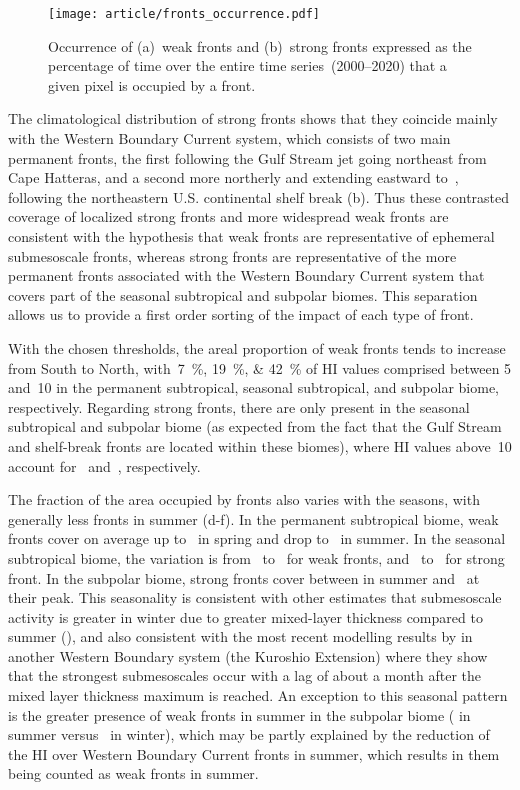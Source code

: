 \begin{figure}
  \centering
  \texttt{[image: article/fronts\_occurrence.pdf]}
  \caption[Occurrence map of strong and weak fronts]{%
    Occurrence of (a)~weak fronts and (b)~strong fronts expressed as the percentage of time over the entire time series~(2000--2020) that a given pixel is occupied by a front.
  }%
  \label{fig:frt-occurrence}
\end{figure}

The climatological distribution of strong fronts shows that they coincide mainly with the Western Boundary Current system, which consists of two main permanent fronts, the first following the Gulf Stream jet going northeast from Cape Hatteras, and a second more northerly and extending eastward to~, following the northeastern U.S. continental shelf break (b).
Thus these contrasted coverage of localized strong fronts and more widespread weak fronts are consistent with the hypothesis that weak fronts are representative of ephemeral submesoscale fronts, whereas strong fronts are representative of the more permanent fronts associated with the Western Boundary Current system that covers part of the seasonal subtropical and subpolar biomes.
This separation allows us to provide a first order sorting of the impact of each type of front.

With the chosen thresholds, the areal proportion of weak fronts tends to increase from South to North, with~\qtylist{7;19;42}{\percent} of HI values comprised between 5 and~10 in the permanent subtropical, seasonal subtropical, and subpolar biome, respectively.
Regarding strong fronts, there are only present in the seasonal subtropical and subpolar biome (as expected from the fact that the Gulf Stream and shelf-break fronts are located within these biomes), where HI values above~10 account for ~and~, respectively.

The fraction of the area occupied by fronts also varies with the seasons, with generally less fronts in summer (d-f).
In the permanent subtropical biome, weak fronts cover on average up to~ in spring and drop to~ in summer.
In the seasonal subtropical biome, the variation is from~ to~ for weak fronts, and ~to~ for strong front.
In the subpolar biome, strong fronts cover between  in summer and~ at their peak.
This seasonality is consistent with other estimates that submesoscale activity is greater in winter due to greater mixed-layer thickness compared to summer (\cite{callies_2015}), and also consistent with the most recent modelling results by \textcite{dong_2020} in another Western Boundary system (the Kuroshio Extension) where they show that the strongest submesoscales occur with a lag of about a month after the mixed layer thickness maximum is reached.
An exception to this seasonal pattern is the greater presence of weak fronts in summer in the subpolar biome ( in summer versus~ in winter), which may be partly explained by the reduction of the HI over Western Boundary Current fronts in summer, which results in them being counted as weak fronts in summer.

